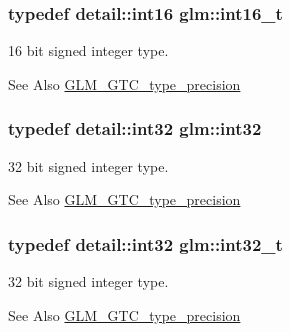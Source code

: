 \hypertarget{group__gtc__type__precision_gaf89ee61e0d34aa4a462104b7ae7f2da6}{
\subsubsection[{int16\-\_\-t}]{\setlength{\rightskip}{0pt plus 5cm}typedef detail\-::int16 {\bf glm\-::int16\-\_\-t}}}\label{group__gtc__type__precision_gaf89ee61e0d34aa4a462104b7ae7f2da6}
16 bit signed integer type. \begin{DoxySeeAlso}{See Also}
\hyperlink{group__gtc__type__precision}{G\-L\-M\-\_\-\-G\-T\-C\-\_\-type\-\_\-precision} 
\end{DoxySeeAlso}
\hypertarget{group__gtc__type__precision_ga632d8b25f6b61659f39ea4321fab92a4}{
\subsubsection[{int32}]{\setlength{\rightskip}{0pt plus 5cm}typedef detail\-::int32 {\bf glm\-::int32}}}\label{group__gtc__type__precision_ga632d8b25f6b61659f39ea4321fab92a4}
32 bit signed integer type. \begin{DoxySeeAlso}{See Also}
\hyperlink{group__gtc__type__precision}{G\-L\-M\-\_\-\-G\-T\-C\-\_\-type\-\_\-precision} 
\end{DoxySeeAlso}
\hypertarget{group__gtc__type__precision_gab870c0eb6f525b0c8c4716762e0fc3a8}{
\subsubsection[{int32\-\_\-t}]{\setlength{\rightskip}{0pt plus 5cm}typedef detail\-::int32 {\bf glm\-::int32\-\_\-t}}}\label{group__gtc__type__precision_gab870c0eb6f525b0c8c4716762e0fc3a8}
32 bit signed integer type. \begin{DoxySeeAlso}{See Also}
\hyperlink{group__gtc__type__precision}{G\-L\-M\-\_\-\-G\-T\-C\-\_\-type\-\_\-precision} 
\end{DoxySeeAlso}
